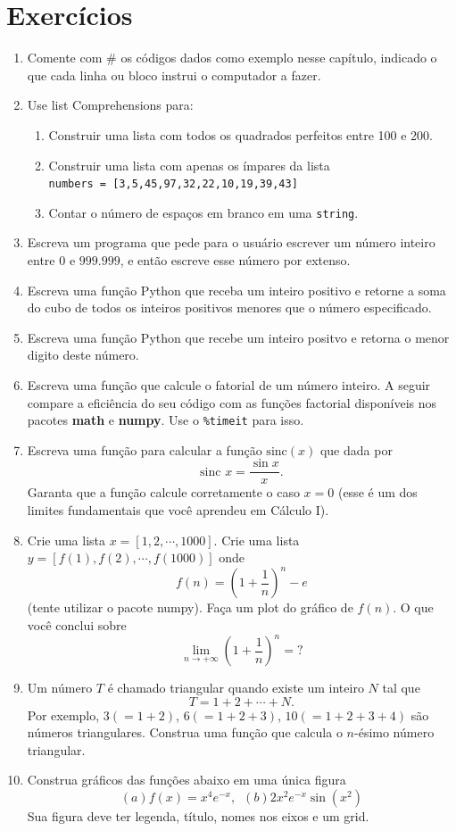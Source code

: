 \section{Exercícios}
\begin{enumerate}
    \item Comente com $\#$ os códigos dados como exemplo nesse capítulo, indicado o que cada linha ou bloco instrui o computador a fazer.
    \item Use list Comprehensions para:
    \begin{enumerate}
        \item Construir uma lista com todos os quadrados perfeitos entre 100 e 200.
        \item Construir uma lista com apenas os ímpares da lista \\{\tt numbers = [3,5,45,97,32,22,10,19,39,43]}
        \item Contar o número de espaços em branco em uma {\tt string}.
    \end{enumerate}
    \item Escreva um programa que pede para o usuário escrever um número inteiro entre $0$ e $999.999$, e então escreve esse número por extenso.
    \item Escreva uma função Python que receba um inteiro positivo e retorne a soma do cubo de todos os inteiros positivos menores que o número especificado.
    \item Escreva uma função Python que recebe um inteiro positvo e retorna o menor digito deste número.
    \item Escreva uma função que calcule o fatorial de um número inteiro. A seguir compare a eficiência do seu código com as funções factorial disponíveis nos pacotes {\bf math} e {\bf numpy}. Use o {\tt \%timeit} para isso.
    \item Escreva uma função para calcular a função $\text{sinc}(x)$ que dada por
    \[ \text{sinc } x = \frac{\sin x}{x}.\]
    Garanta que a função calcule corretamente o caso $x=0$ (esse é um dos limites fundamentais que você aprendeu em Cálculo I).
    \item Crie uma lista $x=[1,2,\cdots,1000]$. Crie uma lista $y=[f(1), f(2), \cdots, f(1000)]$ onde 
    \[ f(n) = \left(1 + \frac{1}{n}\right)^n - e\]
    (tente utilizar o pacote numpy). Faça um plot do gráfico de $f(n)$. O que você conclui sobre
    \[ \lim_{n \rightarrow + \infty} \left(1 + \frac{1}{n}\right)^n = ? \]
    \item Um número $T$ é chamado triangular quando existe um inteiro $N$ tal que
    \[ T = 1+2+ \cdots+ N.\]
    Por exemplo, $3(=1+2)$, $6(=1+2+3)$, $10(=1+2+3+4)$ são números triangulares. Construa uma função que calcula o $n$-ésimo número triangular.
    \item Construa gráficos das funções abaixo em uma única figura
    \[(a) f(x)=x^4 e^{-x},\,\,\, (b) 2x^2e^{-x} \sin(x^2)\]
Sua figura deve ter legenda, título, nomes nos eixos e um grid.


\end{enumerate}

